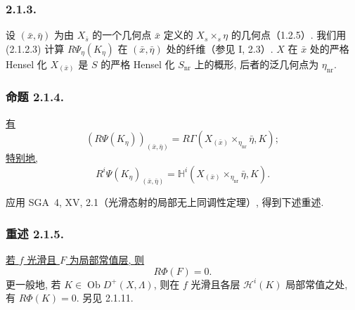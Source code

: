 \subsubsection*{2.1.3.}
设 $(\bar x,\bar\eta)$ 为由 $X_{\bar s}$ 的一个几何点 $\bar x$ 定义的 $X_s\times_s\eta$ 的几何点（1.2.5）. 我们用 (2.1.2.3) 计算 $R\Psi_\eta(K_\eta)$ 在 $(\bar x,\bar\eta)$ 处的纤维（参见 I, 2.3）. $X$ 在 $\bar x$ 处的严格 Hensel 化 $X_{(\bar x)}$ 是 $S$ 的严格 Hensel 化 $S_{\mathrm{nr}}$ 上的概形, 后者的泛几何点为 $\eta_{\mathrm{nr}}$.

\subsubsection*{命题 2.1.4.}
\underline{有}
\begin{equation*}
(R\Psi(K_\eta))_{(\bar x,\bar\eta)}
=R\Gamma\!\left(
X_{(\bar x)}\times_{\eta_{\mathrm{nr}}}\bar\eta,K
\right);
\end{equation*}
\underline{特别地,}
\begin{equation*}
R^i\Psi(K_\eta)_{(\bar x,\bar\eta)}
=\mathbb H^i\!\left(
X_{(\bar x)}\times_{\eta_{\mathrm{nr}}}\bar\eta,K
\right).
\end{equation*}

应用 SGA~4, XV, 2.1（光滑态射的局部无上同调性定理）, 得到下述重述.

\subsubsection*{重述 2.1.5.}
\underline{若 $f$ 光滑且 $F$ 为局部常值层, 则}
\begin{equation*}
R\Phi(F)=0.
\end{equation*}
更一般地, 若 $K\in\operatorname{Ob}D^+(X,\Lambda)$, 则在 $f$ 光滑且各层 $\mathcal H^i(K)$ 局部常值之处, 有 $R\Phi(K)=0$. 另见 2.1.11.

